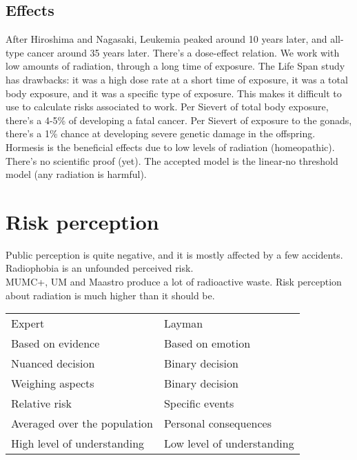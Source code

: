 \subsection{Effects}
After Hiroshima and Nagasaki, Leukemia peaked around 10 years later, and all-type cancer around 35 years later. There's a dose-effect relation. We work with low amounts of radiation, through a long time of exposure. The Life Span study has drawbacks: it was a high dose rate at a short time of exposure, it was a total body exposure, and it was a specific type of exposure. This makes it difficult to use to calculate risks associated to work. Per Sievert of total body exposure, there's a 4-5\% of developing a fatal cancer. Per Sievert of exposure to the gonads, there's a 1\% chance at developing severe genetic damage in the offspring.\\
Hormesis is the beneficial effects due to low levels of radiation (homeopathic). There's no scientific proof (yet). The accepted model is the linear-no threshold model (any radiation is harmful).\\

\section{Risk perception}
Public perception is quite negative, and it is mostly affected by a few accidents. Radiophobia is an unfounded perceived risk.\\
MUMC+, UM and Maastro produce a lot of radioactive waste. Risk perception about radiation is much higher than it should be.\\
\begin{table}[]
\begin{tabular}{ll}
Expert                       & Layman                     \\
Based on evidence            & Based on emotion           \\
Nuanced decision             & Binary decision            \\
Weighing aspects             & Binary decision            \\
Relative risk                & Specific events            \\
Averaged over the population & Personal consequences      \\
High level of understanding  & Low level of understanding
\end{tabular}
\end{table}
